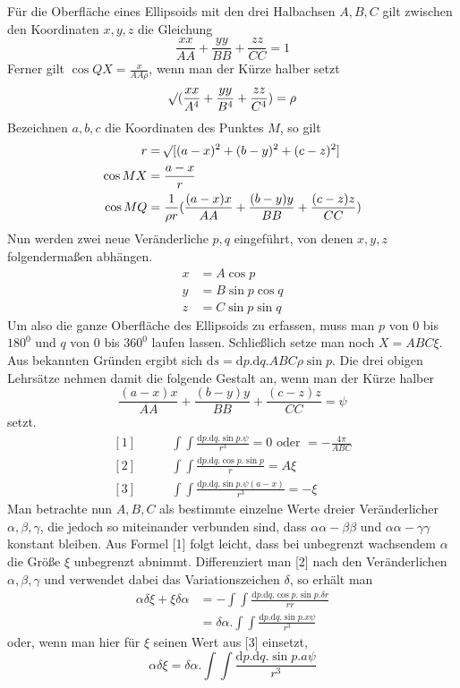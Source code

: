 Für die Oberfläche eines Ellipsoids mit den drei Halbachsen $A,B,C$ gilt zwischen den Koordinaten $x,y,z$ die Gleichung
\[
\frac{xx}{AA}+\frac{yy}{BB}+\frac{zz}{CC}=1
\]
Ferner gilt $\cos QX=\frac{x}{AA\rho}$, wenn man der Kürze halber setzt
\[
\mathord{{}^{}\!\surd}(\frac{xx}{A^4}+\frac{yy}{B^4}+\frac{zz}{C^4})=\rho
\]
Bezeichnen $a,b,c$ die Koordinaten des Punktes $M$, so gilt
\[
\begin{aligned}
r&=\mathord{{}^{}\!\surd}[(a-x)^2+(b-y)^2+(c-z)^2]\\
\cos MX&=\frac{a-x}{r}\\
\cos MQ&=\frac{1}{\rho r}(\frac{(a-x)x}{AA}+\frac{(b-y)y}{BB}+\frac{(c-z)z}{CC})
\end{aligned}
\]
Nun werden zwei neue Veränderliche $p,q$ eingeführt, von denen $x,y,z$ folgendermaßen abhängen.
\[
\begin{aligned}
x&=A\cos p\\
y&=B\sin p\cos q\\
z&=C\sin p\sin q
\end{aligned}
\]
Um also die ganze Oberfläche des Ellipsoids zu erfassen, muss man $p$ von $0$ bis $180^0$ und $q$ von $0$ bis $360^0$ laufen lassen. Schließlich setze man noch $X=ABC\xi$. Aus bekannten Gründen ergibt sich $\mathrm{d}s=\mathrm{d}p.\mathrm{d}q.ABC\rho\sin p$. Die drei obigen Lehrsätze nehmen damit die folgende Gestalt an, wenn man der Kürze halber
\[
\frac{(a-x)x}{AA}+\frac{(b-y)y}{BB}+\frac{(c-z)z}{CC}=\psi
\]
setzt.
\[
\begin{aligned}
[1]\qquad &\int\int\frac{\mathrm{d}p.\mathrm{d}q.\sin p.\psi}{r^3}=0\text{ oder }=-\frac{4\pi}{ABC}\\
[2]\qquad &\int\int\frac{\mathrm{d}p.\mathrm{d}q.\cos p.\sin p}{r}=A\xi\\
[3]\qquad &\int\int\frac{\mathrm{d}p.\mathrm{d}q.\sin p.\psi(a-x)}{r^3}=-\xi
\end{aligned}
\]
Man betrachte nun $A,B,C$ als bestimmte einzelne Werte dreier Veränderlicher $\alpha,\beta,\gamma$, die jedoch so miteinander verbunden sind, dass $\alpha\alpha-\beta\beta$ und $\alpha\alpha-\gamma\gamma$ konstant bleiben. Aus Formel [1] folgt leicht, dass bei unbegrenzt wachsendem $\alpha$ die Größe $\xi$ unbegrenzt abnimmt. Differenziert man [2] nach den Veränderlichen $\alpha,\beta,\gamma$ und verwendet dabei das Variationszeichen $\delta$, so erhält man
\[
\begin{aligned}
\alpha\delta\xi+\xi\delta\alpha&=-\int\int\frac{\mathrm{d}p.\mathrm{d}q.\cos p.\sin p.\delta r}{rr}\\
&=\delta\alpha.\int\int\frac{\mathrm{d}p.\mathrm{d}q.\sin p.x\psi}{r^3}
\end{aligned}
\]
oder, wenn man hier für $\xi$ seinen Wert aus [3] einsetzt,
\[
\alpha\delta\xi=\delta\alpha.\int\int\frac{\mathrm{d}p.\mathrm{d}q.\sin p.a\psi}{r^3}
\]

